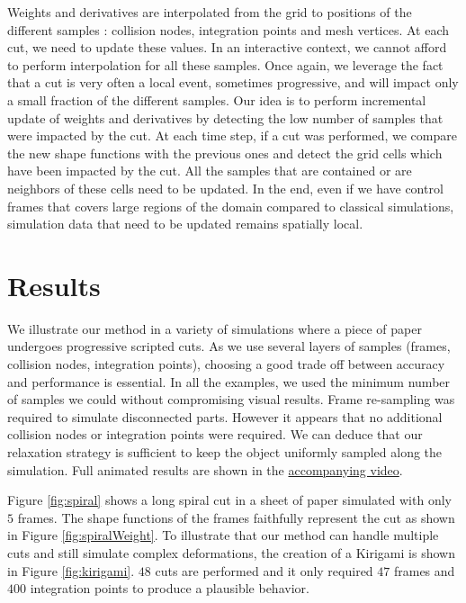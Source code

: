Weights and derivatives are interpolated from the grid to positions of the different samples : collision nodes, integration points and mesh vertices. At each cut, we need to update these values. In an interactive context, we cannot afford to perform interpolation for all these samples. Once again, we leverage the fact that a cut is very often a local event, sometimes progressive, and will impact only a small fraction of the different samples. Our idea is to perform incremental update of weights and derivatives by detecting the low number of samples that were impacted by the cut. At each time step, if a cut was performed, we compare the new shape functions with the previous ones and detect the grid cells which have been impacted by the cut. All the samples that are contained or are neighbors of these cells need to be updated. In the end, even if we have control frames that covers large regions of the domain compared to classical simulations, simulation data that need to be updated remains spatially local.

\section{Results} \label{sec:results}

We illustrate our method in a variety of simulations where a piece of paper undergoes progressive scripted cuts. As we use several layers of samples (frames, collision nodes, integration points), choosing a good trade off between accuracy and performance is essential. In all the examples, we used the minimum number of samples we could without compromising visual results. Frame re-sampling was required to simulate disconnected parts. However it appears that no additional collision nodes or integration points were required. We can deduce that our relaxation strategy is sufficient to keep the object uniformly sampled along the simulation. Full animated results are shown in the \href{https://hal.inria.fr/hal-01206780/file/Manteaux_MIG2015_IDCTS.mp4}{accompanying video}.

Figure \ref{fig:spiral} shows a long spiral cut in a sheet of paper simulated with only $5$ frames. The shape functions of the frames faithfully represent the cut as shown in Figure \ref{fig:spiralWeight}. 
To illustrate that our method can handle multiple cuts and still simulate complex deformations, the creation of a Kirigami is shown in Figure \ref{fig:kirigami}. $48$ cuts are performed and it only required $47$ frames and $400$ integration points to produce a plausible behavior.

